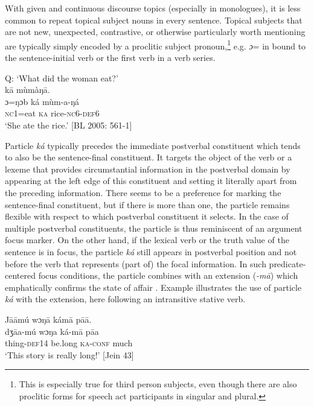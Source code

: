 \documentclass[output=paper]{langsci/langscibook}
\begin{document}
With given and continuous discourse topics (especially in monologues), it is less common to repeat topical subject nouns in every sentence. Topical subjects that are not new, unexpected, contrastive, or otherwise particularly worth mentioning are typically simply encoded by a proclitic subject pronoun,\footnote{This is especially true for third person subjects, even though there are also proclitic forms for speech act participants in singular and plural.} e.g. \textit{ɔ}= in  bound to the sentence-initial verb or the first verb in a verb series. 

\ea\label{ex:schwarz:8}
Q: `What did the woman eat?'\\
  k\={a}  mùmàŋ\={a}.\\
  \textup{ɔ=ŋɔb}    {ká}  {mùm-a-ŋá}\\
     \textsc{nc1}=eat  \textsc{ka}  rice-\textsc{nc}6-\textsc{def}6\\
\glt ‘She ate the rice.’ [BL  2005: 561-1]
\z

Particle \textit{ká} typically precedes the immediate postverbal constituent which tends to also be the sentence-final constituent. It targets the object of the verb or a lexeme that provides circumstantial information in the postverbal domain by appearing at the left edge of this constituent and setting it literally apart from the preceding information. There seems to be a preference for marking the sentence-final constituent, but if there is more than one, the particle remains flexible with respect to which postverbal constituent it selects. In the case of multiple postverbal constituents, the particle is thus reminiscent of an argument focus marker. On the other hand, if the lexical verb or the truth value of the sentence is in focus, the particle \textit{ká} still appears in postverbal position and not before the verb that represents (part of) the focal information. In such predicate-centered focus conditions, the particle combines with an extension (\textit{-m\={a}}) which emphatically confirms the state of affair \citep{Schwarz2010b}. Example  illustrates the use of particle \textit{ká} with the extension, here following an intransitive stative verb.

\ea\label{ex:schwarz:9}
\glll   J\={a}\={a}mú    wɔŋ\={a}    kám\={a}    p\={a}\={a}.\\
  \textup{dʒ\={a}a-mú}  {wɔŋa}    {ká-m\={a}}    {p\={a}a}\\
     thing-\textsc{def}14  be.long  \textsc{ka}-\textsc{conf}  much\\
\glt ‘This story is really long!’ [Jein 43]
\z
\end{document}
